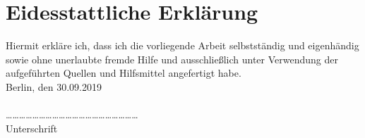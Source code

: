 \chapter*{Eidesstattliche Erklärung}
Hiermit erkläre ich, dass ich die vorliegende Arbeit selbstständig und eigenhändig sowie ohne unerlaubte fremde Hilfe und ausschließlich unter Verwendung der aufgeführten Quellen und Hilfsmittel angefertigt habe.\\

Berlin, den 30.09.2019\\
\\

……………………………………………………\\
Unterschrift